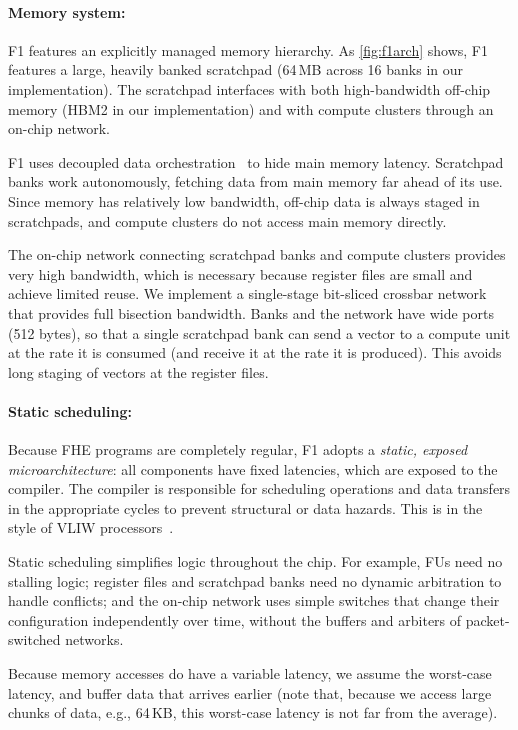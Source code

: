 \figFOneArch

\paragraph{Memory system:}
F1 features an explicitly managed memory hierarchy. As \autoref{fig:f1arch}
shows, F1 features a large, heavily banked scratchpad (64\,MB across {16} banks
in our implementation). The scratchpad interfaces with both high-bandwidth
off-chip memory (HBM2 in our implementation) and with compute clusters through
an on-chip network.

F1 uses decoupled data orchestration~\cite{pellauer:asplos19:buffets} to hide
main memory latency. Scratchpad banks work autonomously, fetching data from
main memory far ahead of its use. Since memory has relatively low bandwidth,
off-chip data is always staged in scratchpads, and compute clusters do not
access main memory directly.

The on-chip network connecting scratchpad banks and compute clusters provides
very high bandwidth, which is necessary because register files are small and
achieve limited reuse. We implement a single-stage bit-sliced crossbar
network~\cite{passas:tocaid12:crossbar} that provides full bisection bandwidth.
Banks and the network have wide ports (512 bytes), so that a single scratchpad
bank can send a vector to a compute unit at the rate it is consumed (and
receive it at the rate it is produced). This avoids long staging of vectors at
the register files.

\paragraph{Static scheduling:}
Because FHE programs are completely regular, F1 adopts a \emph{static, exposed
microarchitecture}: all components have fixed latencies, which are exposed to
the compiler. The compiler is responsible for scheduling operations and data
transfers in the appropriate cycles to prevent structural or data hazards. This
is in the style of VLIW processors~\cite{fisher:isca83:very}.

Static scheduling simplifies logic throughout the chip. For example, FUs need
no stalling logic; register files and scratchpad banks need no dynamic
arbitration to handle conflicts; and the on-chip network uses simple switches
that change their configuration independently over time, without the buffers
and arbiters of packet-switched networks.

Because memory accesses do have a variable latency, we assume the worst-case
latency, and buffer data that arrives earlier (note that, because we access
large chunks of data, e.g., 64\,KB, this worst-case latency is not far from the
average).

